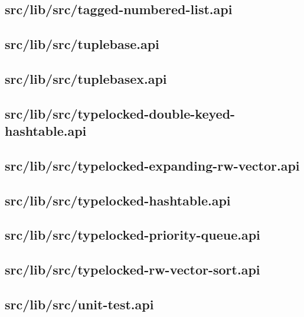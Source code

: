 \subsection{src/lib/src/tagged-numbered-list.api}


\subsection{src/lib/src/tuplebase.api}


\subsection{src/lib/src/tuplebasex.api}


\subsection{src/lib/src/typelocked-double-keyed-hashtable.api}


\subsection{src/lib/src/typelocked-expanding-rw-vector.api}


\subsection{src/lib/src/typelocked-hashtable.api}


\subsection{src/lib/src/typelocked-priority-queue.api}


\subsection{src/lib/src/typelocked-rw-vector-sort.api}


\subsection{src/lib/src/unit-test.api}


